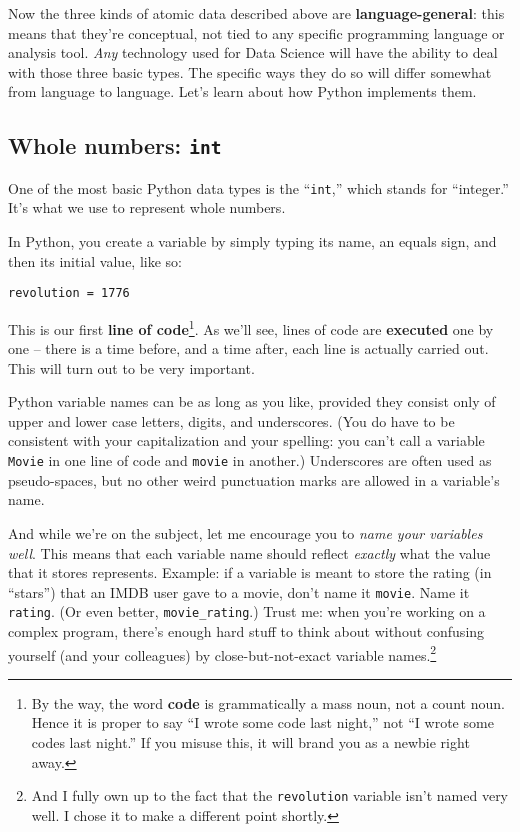 Now the three kinds of atomic data described above are
\textbf{language-general}: this means that they're conceptual, not tied to any
specific programming language or analysis tool. \textit{Any} technology used
for Data Science will have the ability to deal with those three basic types.
The specific ways they do so will differ somewhat from language to language.
Let's learn about how Python implements them.

\subsection{Whole numbers: \texttt{int}}

One of the most basic Python data types is the ``\texttt{int},'' which stands
for ``integer.'' It's what we use to represent whole numbers.

In Python, you create a variable by simply typing its name, an equals sign, and
then its initial value, like so:

\begin{Verbatim}[fontsize=\small,samepage=true,frame=single,framesep=3mm]
revolution = 1776
\end{Verbatim}

This is our first \textbf{line of code}\footnote{By the way, the word
\textbf{code} is grammatically a mass noun, not a count noun. Hence it is
proper to say ``I wrote some code last night,'' not ``I wrote some codes last
night.'' If you misuse this, it will brand you as a newbie right away.}. As
we'll see, lines of code are \textbf{executed} one by one -- there is a time
before, and a time after, each line is actually carried out. This will turn out
to be very important.

Python variable names can be as long as you like, provided they consist only of
upper and lower case letters, digits, and underscores. (You do have to be
consistent with your capitalization and your spelling: you can't call a
variable \texttt{Movie} in one line of code and \texttt{movie} in another.)
Underscores are often used as pseudo-spaces, but no other weird punctuation
marks are allowed in a variable's name.

And while we're on the subject, let me encourage you to \textit{name your
variables well}. This means that each variable name should reflect
\textit{exactly} what the value that it stores represents. Example: if a
variable is meant to store the rating (in ``stars'') that an IMDB user gave to
a movie, don't name it \texttt{movie}. Name it \texttt{rating}. (Or even
better, \texttt{movie\_rating}.) Trust me: when you're working on a complex
program, there's enough hard stuff to think about without confusing yourself
(and your colleagues) by close-but-not-exact variable names.\footnote{And I
fully own up to the fact that the \texttt{revolution} variable isn't named very
well. I chose it to make a different point shortly.}

